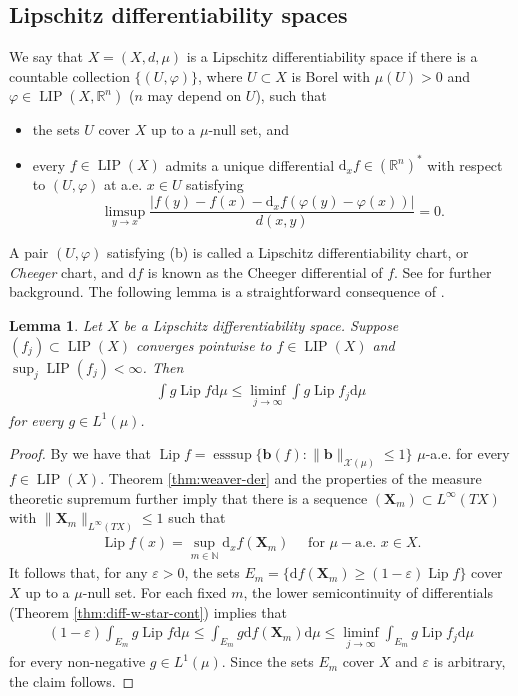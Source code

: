 \documentclass{amsart}
\newtheorem{lemma}[theorem]{Lemma}
\numberwithin{equation}{section}
\newcommand{\R}{\mathbb{R}}
\newcommand{\N}{\mathbb{N}}
\newcommand{\esssup}{\operatorname{esssup}}
\newcommand{\Lip}{\operatorname{Lip}}
\newcommand{\LIP}{\operatorname{LIP}}
\newcommand{\ud}{\mathrm {d}}
\begin{document}
\subsection{Lipschitz differentiability spaces} We say that $X=(X,d,\mu)$ is a Lipschitz differentiability space if there is a countable collection $\{(U,\varphi)\}$, where $U\subset X$ is Borel with $\mu(U)>0$ and $\varphi\in \LIP(X,\R^n)$ ($n$ may depend on $U$), such that 
\begin{itemize}
    \item[(a)] the sets $U$ cover $X$ up to a $\mu$-null set, and 
    \item[(b)] every $f\in \LIP(X)$ admits a unique differential $\ud_xf\in (\R^n)^*$ with respect to $(U,\varphi)$ at a.e. $x\in U$ satisfying 
\[
\limsup_{y\to x}\frac{|f(y)-f(x)-\ud_xf(\varphi(y)-\varphi(x))|}{d(x,y)}=0.
\]
\end{itemize}
A pair $(U,\varphi)$ satisfying (b) is called a Lipschitz differentiability chart, or \emph{Cheeger} chart, and $\ud f$ is known as the Cheeger differential of $f$. See \cite{che99,kei02,bate15} for further background. The following lemma is a straightforward consequence of \cite[Theorem 1.15]{sch16b}. 
\begin{lemma}\label{lem:Lip-lsc} Let $X$ be a Lipschitz differentiability space. 
Suppose $(f_j)\subset \LIP(X)$ converges pointwise to $f\in \LIP(X)$ and $\sup_j\LIP(f_j)<\infty$. Then
\begin{align*}
	\int g\Lip f\ud\mu\le \liminf_{j\to\infty}\int g\Lip f_j\ud\mu
\end{align*}	
for every $g\in L^1(\mu)$.
\end{lemma}
\begin{proof}
By \cite[Theorem 1.15]{sch16b} we have that $\Lip f=\esssup\{\bm b(f):\|\bm b\|_{\mathcal X(\mu)}\le 1\}$ $\mu$-a.e. for every $f\in \LIP(X)$. Theorem \ref{thm:weaver-der} and the properties of the measure theoretic supremum further imply that there is a sequence $(\bm X_m)\subset L^\infty(TX)$ with $\|\bm X_m\|_{L^\infty(TX)}\le 1$ such that
\begin{align*}
	\Lip f(x)=\sup_{m\in \N}\ud_x f(\bm X_m)\quad \text{ for } \mu-\text{a.e. } x\in X.
\end{align*}
It follows that, for any $\varepsilon>0$, the sets $E_m=\{\ud f(\bm X_m)\ge (1-\varepsilon)\Lip f \}$ cover $X$ up to a $\mu$-null set. For each fixed $m$, the lower semicontinuity of differentials (Theorem \ref{thm:diff-w-star-cont}) implies that
\begin{align*}
	(1-\varepsilon)\int_{E_m}g\Lip f\ud\mu\le \int_{E_m}  g\ud f(\bm X_m)\ud\mu\le \liminf_{j\to\infty}\int_{E_m} g\Lip f_j\ud\mu
\end{align*}
for every non-negative $g\in L^1(\mu)$. Since the sets $E_m$ cover $X$ and $\varepsilon$ is arbitrary, the claim follows.

\end{proof}
\end{document}
